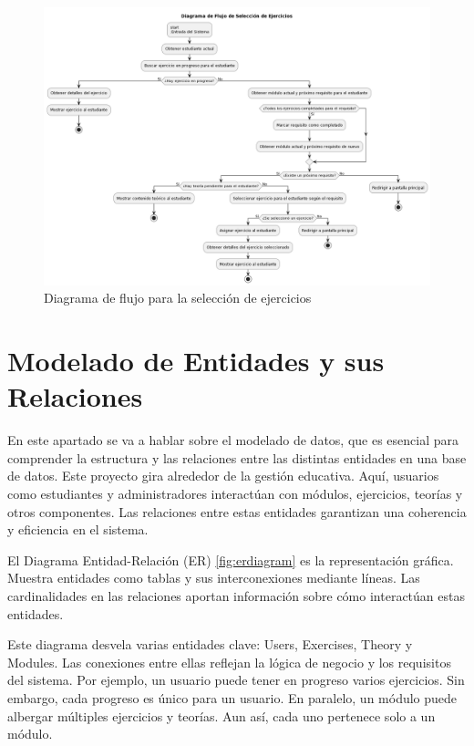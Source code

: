 \begin{figure}[H]
\centering
\includegraphics[width=\textwidth]{imagenes/seleccionejercicios.png}
\caption{Diagrama de flujo para la selección de ejercicios}
\label{fig:seleccion}
\end{figure}


\section{Modelado de Entidades y sus Relaciones}

En este apartado se va a hablar sobre el modelado de datos, que es esencial para comprender la estructura y las relaciones entre las distintas entidades en una base de datos. Este proyecto gira alrededor de la gestión educativa. Aquí, usuarios como estudiantes y administradores interactúan con módulos, ejercicios, teorías y otros componentes. Las relaciones entre estas entidades garantizan una coherencia y eficiencia en el sistema. 

El Diagrama Entidad-Relación (ER) \ref{fig:erdiagram} es la representación gráfica. Muestra entidades como tablas y sus interconexiones mediante líneas. Las cardinalidades en las relaciones aportan información sobre cómo interactúan estas entidades.

Este diagrama desvela varias entidades clave: Users, Exercises, Theory y Modules. Las conexiones entre ellas reflejan la lógica de negocio y los requisitos del sistema. Por ejemplo, un usuario puede tener en progreso varios ejercicios. Sin embargo, cada progreso es único para un usuario. En paralelo, un módulo puede albergar múltiples ejercicios y teorías. Aun así, cada uno pertenece solo a un módulo.


